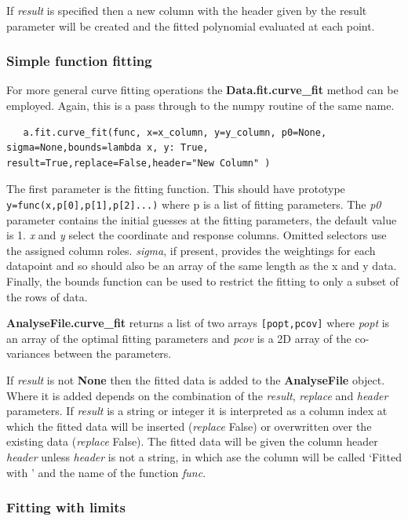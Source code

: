 \documentclass[a4paper,11pt]{scrartcl}
\begin{document}
If \textit{result} is specified then a new column with the header given by the result parameter will be created and the fitted polynomial evaluated at each point.

\subsubsection{Simple function fitting}

For more general curve fitting operations the \textbf{Data.fit.curve\_fit}
method can be employed. Again, this is a pass through to the numpy routine of
the same name.

\begin{lstlisting}
   a.fit.curve_fit(func, x=x_column, y=y_column, p0=None, sigma=None,bounds=lambda x, y: True, result=True,replace=False,header="New Column" )
\end{lstlisting}

The first parameter is the fitting function. This should have prototype
\\\verb:y=func(x,p[0],p[1],p[2]...): where p is a list of fitting parameters.
The \textit{p0} parameter contains the initial guesses at the fitting
parameters, the default value is 1. \textit{x} and \textit{y} select the coordinate
and response columns. Omitted selectors use the assigned column roles.
\textit{sigma}, if present, provides the weightings for each datapoint and so
should also be an array of the same length as the x and y data. Finally, the
bounds function can be used to restrict the fitting to only a subset of the rows
of data.

\textbf{AnalyseFile.curve\_fit} returns a list of two arrays \verb:[popt,pcov]:
where \textit{popt} is an array of the optimal fitting parameters and
\textit{pcov} is a 2D array of the co-variances between the parameters.

If \textit{result} is not \textbf{None} then the fitted data is added to the \textbf{AnalyseFile}
object. Where it is added depends on the combination of the \textit{result}, \textit{replace}
and \textit{header} parameters. If \textit{result} is a string or integer it is interpreted as a column
index at which the fitted data will be inserted (\textit{replace} False) or overwritten over the existing data (\textit{replace} False).
The fitted data will be given the column header \textit{header} unless \textit{header} is not a string, in which ase the column
will be called `Fitted with ' and the name of the function \textit{func}.


\subsubsection{Fitting with limits}
\end{document}
